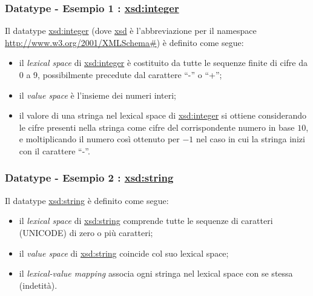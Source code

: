 \documentclass[8pt]{beamer}
\begin{document}
\begin{frame}
\frametitle{Datatype - Esempio 1 : \url{xsd:integer}}
Il datatype \url{xsd:integer} (dove \url{xsd} \`e l'abbreviazione per il namespace \url{http://www.w3.org/2001/XMLSchema\#})
\`e definito come segue:

\begin{itemize}
 \item il \emph{lexical space} di \url{xsd:integer} \`e costituito da tutte le sequenze finite di cifre da 0 a 9, possibilmente
 precedute dal carattere ``-'' o ``+'';
 \item il \emph{value space} \`e l'insieme dei numeri interi;
 \item il valore di una stringa nel lexical space di \url{xsd:integer} si ottiene considerando le cifre 
 presenti nella stringa come cifre del corrispondente numero in base $10$, e moltiplicando il numero cos\`i ottenuto per
 $-1$ nel caso in cui la stringa inizi con il carattere ``-''.
\end{itemize}
\end{frame}

\begin{frame}
\frametitle{Datatype - Esempio 2 : \url{xsd:string}}
Il datatype \url{xsd:string} \`e definito come segue:

\begin{itemize}
 \item il \emph{lexical space} di \url{xsd:string} comprende 
 tutte le sequenze di caratteri (UNICODE) di zero o pi\`u caratteri;
 \item il \emph{value space} di \url{xsd:string} coincide col suo 
 lexical space;
 \item il \emph{lexical-value mapping} associa ogni stringa nel lexical space
 con se stessa (indetit\`a).
 \end{itemize}
\end{frame}
\end{document}
